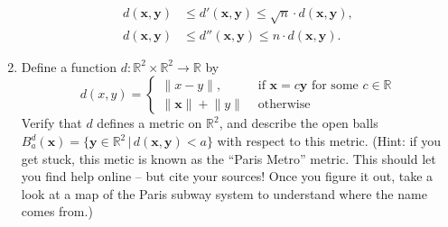 \documentclass[letterpaper,12pt]{article}
\newcommand{\len}[1]{\lVert #1\rVert}
\newcommand{\R}{\mathbb{R}}
\newcommand{\x}{\mathbf{x}}
\newcommand{\y}{\mathbf{y}}
\begin{document}
\begin{enumerate}
\begin{align*}
 d(\x,\y)&\leq d'(\x,\y)\leq \sqrt{n}\cdot d(\x,\y),\\
 d(\x,\y)&\leq d''(\x,\y)\leq n\cdot d(\x,\y).
\end{align*}
 \item Define a function $d:\R^2\times\R^2\to \R$ by
\[
 d(x,y) = \begin{cases}
           \len{x-y}, & \text{ if } \x=c\y \text{ for some } c\in\R\\
           \len{\x}+\len{y} & \text{ otherwise}
          \end{cases}
\]
Verify that $d$ defines a metric on $\R^2$, and describe the open balls $B^d_a(\x) = \{\y\in\R^2 \,|\, d(\x,\y)<a\}$ with respect to this metric. (Hint: if you get stuck, this metic is known as the ``Paris Metro'' metric. This should let you find help online -- but cite your sources! Once you figure it out, take a look at a map of the Paris subway system to understand where the name comes from.)
\end{enumerate}
\end{document}
